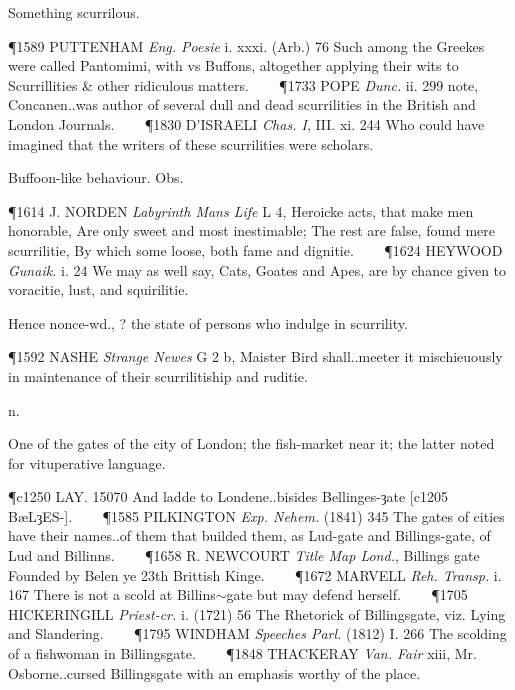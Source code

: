 \begin{description}[wide, labelwidth=!, labelindent=0pt]
\begin{myenumerate}
 Something scurrilous.

\P 1589 PUTTENHAM  \textit{Eng. Poesie} i. xxxi. (Arb.) 76 Such among the Greekes were called Pantomimi, with vs Buffons, altogether applying their wits to Scurrillities \& other ridiculous matters.    
\P 1733 POPE  \textit{Dunc.} ii. 299 note, Concanen..was author of several dull and dead scurrilities in the British and London Journals.    
\P 1830 D'ISRAELI  \textit{Chas. I}, III. xi. 244 Who could have imagined that the writers of these scurrilities were scholars.

 Buffoon-like behaviour. Obs.

\P 1614 J. NORDEN  \textit{Labyrinth Mans Life} L 4, Heroicke acts, that make men honorable, Are only sweet and most inestimable; The rest are false, found mere scurrilitie, By which some loose, both fame and dignitie.    
\P 1624 HEYWOOD  \textit{Gunaik.} i. 24 We may as well say, Cats, Goates and Apes, are by chance given to voracitie, lust, and squirilitie.

\noindent Hence \textbf{} nonce-wd., ? the state of persons who indulge in scurrility.

\P 1592 NASHE  \textit{Strange Newes} G 2 b, Maister Bird shall..meeter it mischieuously in maintenance of their scurrilitiship and ruditie.
\end{myenumerate}


 n.

\noindent {}

\vspace{-0.3cm}

\begin{myenumerate}

 One of the gates of the city of London; the fish-market near it; the latter noted for vituperative language.

\P c1250 LAY. 15070 And ladde to Londene..bisides Bellinges-ȝate [c1205 BæLȝES-].    
\P 1585 PILKINGTON  \textit{Exp. Nehem.} (1841) 345 The gates of cities have their names..of them that builded them, as Lud-gate and Billings-gate, of Lud and Billinns.    
\P 1658 R. NEWCOURT  \textit{Title Map Lond.}, Billings gate Founded by Belen ye 23th Brittish Kinge.    
\P 1672 MARVELL  \textit{Reh. Transp.} i. 167 There is not a scold at Billins$\sim$gate but may defend herself.    
\P 1705 HICKERINGILL  \textit{Priest-cr.} i. (1721) 56 The Rhetorick of Billingsgate, viz. Lying and Slandering.    
\P 1795 WINDHAM  \textit{Speeches Parl.} (1812) I. 266 The scolding of a fishwoman in Billingsgate.    
\P 1848 THACKERAY  \textit{Van. Fair} xiii, Mr. Osborne..cursed Billingsgate with an emphasis worthy of the place.


\end{myenumerate}
\end{description}

